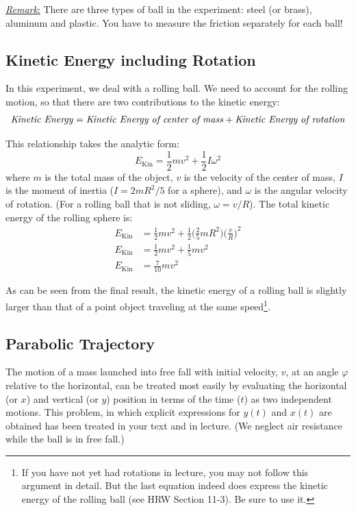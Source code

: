\underline{\emph{Remark}:} There are three types of ball in the experiment: steel (or brass), aluminum and plastic. You have to measure the friction separately for each ball!

\subsection{Kinetic Energy including Rotation}

In this experiment, we deal with a rolling ball. We need to account for the rolling motion, so that there are two contributions to the kinetic energy:
\begin{equation}
  \textrm{\emph{Kinetic Energy}} = \textrm{\emph{Kinetic Energy of center of mass}}+\textrm{\emph{Kinetic Energy of rotation}}
\end{equation}

This relationship takes the analytic form:
\begin{equation}
  E_{\textrm{Kin}}=\frac{1}{2}mv^2+\frac{1}{2}I\omega^2
\end{equation}
where $m$ is the total mass of the object, $v$ is the velocity of the center of mass, $I$ is the moment of inertia ($I = 2m R^2/5$ for a sphere), and $\omega$ is the angular velocity of rotation. (For a rolling ball that is not sliding, $\omega=v/R$). The total kinetic energy of the rolling sphere is:
\begin{align}
  E_{\textrm{Kin}}&=\frac{1}{2}mv^2+\frac{1}{2}\bigg(\frac{2}{5}mR^2\bigg)\bigg(\frac{v}{R}\bigg)^2\\
  E_{\textrm{Kin}}&=\frac{1}{2}mv^2+\frac{1}{5}mv^2\\
  E_{\textrm{Kin}}&=\frac{7}{10}mv^2
\end{align}

As can be seen from the final result, the kinetic energy of a rolling ball is slightly larger than that of a point object traveling at the same speed\footnote{If you have not yet had rotations in lecture, you may not follow this argument in detail. But the last equation indeed does express the kinetic energy of the rolling ball (see HRW Section 11-3). Be sure to use it.}.

\subsection{Parabolic Trajectory}
The motion of a mass launched into free fall with initial velocity, $v$, at an angle $\varphi$ relative to the horizontal, can be treated most easily by evaluating the horizontal (or $x$) and vertical (or $y$) position in terms of the time ($t$) as two independent motions. This problem, in which explicit expressions for $y(t)$ and $x(t)$ are obtained has been treated in your text and in lecture. (We neglect air resistance while the ball is in free fall.)

